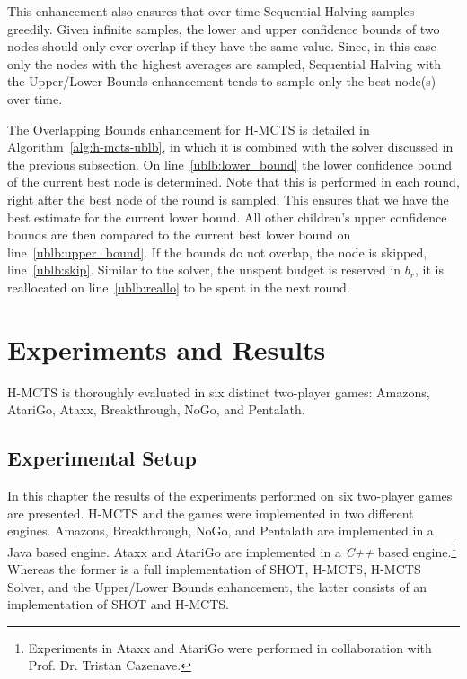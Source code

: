 \documentclass{kecsmstr}
\begin{document}
This enhancement also ensures that over time Sequential Halving samples greedily. Given infinite samples, the lower and upper confidence bounds of two nodes should only ever overlap if they have the same value. Since, in this case only the nodes with the highest averages are sampled, Sequential Halving with the Upper/Lower Bounds enhancement tends to sample only the best node(s) over time.

The Overlapping Bounds enhancement for H-MCTS is detailed in Algorithm~\ref{alg:h-mcts-ublb}, in which it is combined with the solver discussed in the previous subsection. On line~\ref{ublb:lower_bound} the lower confidence bound of the current best node is determined. Note that this is performed in each round, right after the best node of the round is sampled. This ensures that we have the best estimate for the current lower bound. All other children's upper confidence bounds are then compared to the current best lower bound on line~\ref{ublb:upper_bound}. If the bounds do not overlap, the node is skipped, line~\ref{ublb:skip}. Similar to the solver, the unspent budget is reserved in $b_r$, it is reallocated on line~\ref{ublb:reallo} to be spent in the next round.

\chapter{Experiments and Results}
\label{chap:experiments}
\begin{chaptercontents}
H-MCTS is thoroughly evaluated in six distinct two-player games: Amazons, AtariGo, Ataxx, Breakthrough, NoGo, and Pentalath.
\end{chaptercontents}

\section{Experimental Setup}
\label{sec:ex_setup}
In this chapter the results of the experiments performed on six two-player games are presented. H-MCTS and the games were implemented in two different engines. Amazons, Breakthrough, NoGo, and Pentalath are implemented in a Java based engine. Ataxx and AtariGo are implemented in a \emph{C++} based engine.\footnote{Experiments in Ataxx and AtariGo were performed in collaboration with Prof. Dr. Tristan Cazenave.} Whereas the former is a full implementation of SHOT, H-MCTS, H-MCTS Solver, and the Upper/Lower Bounds enhancement, the latter consists of an implementation of SHOT and H-MCTS.
\end{document}
